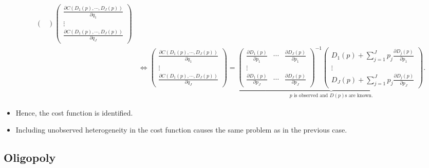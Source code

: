 \documentclass[
]{book}
\begin{document}
\begin{itemize}
\begin{equation}
\begin{split}
\begin{pmatrix}
  \end{pmatrix}
  \begin{pmatrix}
  \frac{\partial C(D_1(p), \cdots, D_J(p))}{\partial q_1}\\
  \vdots\\
  \frac{\partial C(D_1(p), \cdots, D_J(p))}{\partial q_J}
  \end{pmatrix}\\
  &\Leftrightarrow
  \begin{pmatrix}
  \frac{\partial C(D_1(p), \cdots, D_J(p))}{\partial q_1}\\
  \vdots\\
  \frac{\partial C(D_1(p), \cdots, D_J(p))}{\partial q_J}
  \end{pmatrix} = 
  \underbrace{\begin{pmatrix}
  \frac{\partial D_1(p)}{\partial p_1} & \cdots & \frac{\partial D_J(p)}{\partial p_1}\\
  \vdots\\
  \frac{\partial D_1(p)}{\partial p_J} & \cdots & \frac{\partial D_J(p)}{\partial p_J}
  \end{pmatrix}^{-1}  
  \begin{pmatrix}
   D_1(p) + \sum_{j = 1}^J p_j \frac{\partial D_j(p)}{\partial p_1}\\
   \vdots\\
   D_J(p) + \sum_{j = 1}^J p_j \frac{\partial D_j(p)}{\partial p_J}
  \end{pmatrix}.}_{\text{$p$ is observed and $D(p)$s are known.}}
  \end{split}
  \end{equation}
\item
  Hence, the cost function is identified.
\item
  Including unobserved heterogeneity in the cost function causes the same problem as in the previous case.
\end{itemize}

\hypertarget{oligopoly}{%
\subsection{Oligopoly}\label{oligopoly}}
\end{document}
